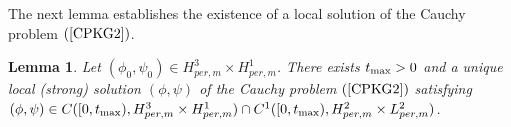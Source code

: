 \documentclass[12pt,reqno,a4paper]{amsart} %
\numberwithin{equation}{section}
\numberwithin{figure}{section}
\newtheorem{lemma}[theorem]{Lemma}
\begin{document}
\indent The next lemma establishes the existence of a local solution of the Cauchy problem $(\ref{CPKG2})$.

\begin{lemma}\label{lwpthm1}
Let $(\phi_0,\psi_0)\in H_{per,m}^3\times H_{per,m}^1$. There exists $t_{\rm{max}}>0$ and a unique local (strong) solution   $(\phi,\psi)$ of the Cauchy problem $(\ref{CPKG2})$ satisfying $(\phi,\psi)\in C([0,t_{\rm{max}}),H_{per,m}^3\times H_{per,m}^1)\cap C^1([0,t_{\rm{max}}),H_{per,m}^2\times L_{per,m}^2) $. %
\end{lemma}
\end{document}

